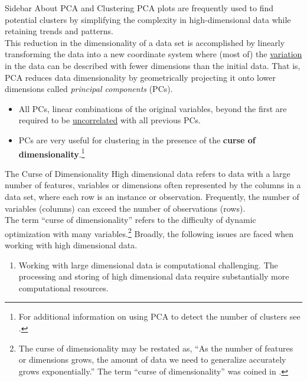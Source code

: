 \documentclass[pdf]{beamer}
\newcommand{\empr}[1]{{\color{franklinblue}\textbf{#1}}}
\theoremstyle{remark}
\theoremstyle{definition}
\begin{document}
\begin{frame}[t]{Sidebar About PCA and Clustering}
PCA plots are frequently used to find potential clusters by simplifying the complexity in high-dimensional data while retaining trends and patterns.  \\
\vspace{1.5ex} 
This reduction in  the dimensionality of a data set is accomplished by linearly transforming the data into a new coordinate system where (most of) the \underline{variation} in the data can be described with fewer dimensions than the initial data.  That is, PCA reduces data dimensionality by geometrically projecting it onto lower dimensions called \textit{principal components} (PCs). 
\small
\vspace{-1.0ex}
\begin{itemize}
\item All PCs, linear combinations of the original variables, beyond the first are required to be \underline{uncorrelated} with all previous PCs.
\item  PCs are very useful for clustering in the presence of the \empr{curse of dimensionality}.\footnote{For additional information on using PCA to detect the number of clusters see \cite{lever2017}.} 
\end{itemize}
\end{frame}

\begin{frame}[t]{The Curse of Dimensionality}
High dimensional data refers to data with a large number of features, variables or dimensions often represented by the columns in a data set, where each row is an instance or observation. Frequently, the number of variables (columns) can exceed the number of observations (rows).\\
\vspace{1.5ex}
The term ``curse of dimensionality'' refers to the difficulty of dynamic optimization with many variables.\footnote{The curse of dimensionality may be restated as, ``As the number of features or dimensions grows, the amount of data we need to generalize accurately grows exponentially.'' The term ``curse of dimensionality'' was coined in \cite{bellman1957}.} Broadly, the following issues are faced when working with high dimensional data.
\begin{enumerate}
  \item Working with large dimensional data is computational challenging. The processing and storing of high dimensional data require substantially more computational resources. 
\end{enumerate}
\end{frame}
\end{document}
